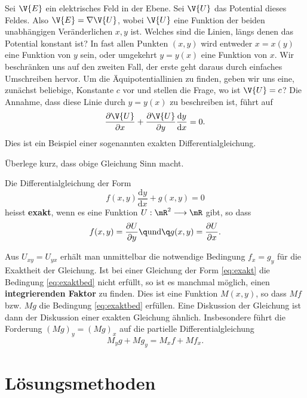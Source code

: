 \documentclass[%
draft,
11pt,%
twoside,%
titlepage,%
german,%
headsepline%
]{scrartcl}
\begin{document}
Sei $\V{E}$ ein elektrisches Feld in der Ebene.
Sei $\V{U}$ das Potential dieses Feldes. Also $\V{E}=\nabla\V{U}$, wobei $\V{U}$ eine Funktion der beiden unabh\"angigen Ver\"anderlichen $x,y$ ist. Welches sind die Linien, l\"angs denen das Potential konstant ist? In fast allen Punkten $(x,y)$ wird entweder $x = x(y)$ eine Funktion von $y$ sein, oder umgekehrt $y = y(x)$ eine Funktion von $x$.
Wir beschr\"anken uns auf den zweiten Fall, der erste geht daraus durch einfaches Umschreiben hervor.
Um die \"Aquipotentiallinien zu finden, geben wir uns eine, zun\"achst beliebige, Konstante $c$ vor und stellen die Frage, wo ist $\V{U}= c$? Die Annahme, dass diese Linie durch $y = y(x)$ zu beschreiben ist, f\"uhrt auf
$$\frac{\partial\V{U}}{\partial x}+\frac{\partial\V{U}}{\partial y}\frac{\mathrm{d}y}{\mathrm{d}x}=0.$$
Dies ist ein Beispiel einer sogenannten exakten Differentialgleichung.

\begin{ueb}
\"Uberlege kurz, dass obige Gleichung Sinn macht.
\end{ueb}

\begin{defn}
Die
Differentialgleichung der Form
\begin{equation}\label{eq:exakt}
f(x,y)\frac{\mathrm{d}y}{\mathrm{d}x}+g(x,y)=0
\end{equation}
heisst \textbf{exakt}, wenn es eine Funktion $U:\mR^2\longrightarrow\mR$ gibt, so dass
\begin{equation}\label{eq:exaktbed}
f(x,y)=\frac{\partial U}{\partial y}\q\text{und}\q g(x,y)=\frac{\partial U}{\partial x}.
\end{equation}
\end{defn}
\noindent Aus $U_{xy}=U_{yx}$ erh\"alt man unmittelbar die notwendige Bedingung $f_x=g_y$ f\"ur die Exaktheit der Gleichung. Ist bei einer Gleichung der Form \eqref{eq:exakt} die Bedingung \eqref{eq:exaktbed} nicht erf\"ullt, so ist es manchmal m\"oglich, einen \textbf{integrierenden Faktor} zu finden. Dies ist eine Funktion $M(x,y)$, so dass $Mf$ bzw. $Mg$ die Bedingung \eqref{eq:exaktbed} erf\"ullen. Eine Diskussion der Gleichung ist dann der Diskussion einer exakten Gleichung \"ahnlich. Insbesondere f\"uhrt die Forderung $(Mg)_y=(Mg)_x$ auf die partielle Differentialgleichung
$$M_yg+Mg_y=M_xf+Mf_x.$$

\newpage

\section{L\"osungsmethoden}
\end{document}
